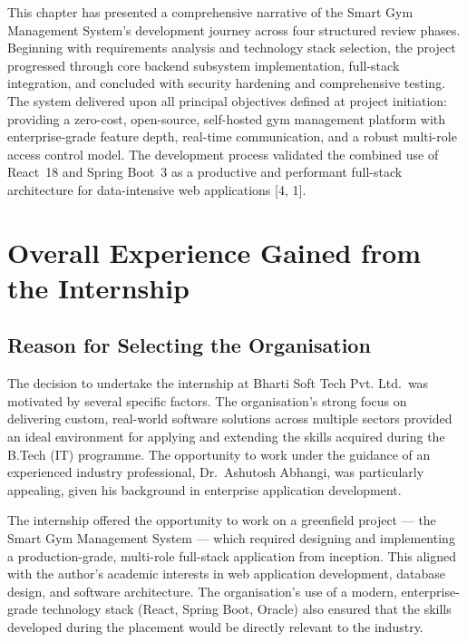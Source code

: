 \documentclass[
  12pt,
  a4paperpaper,
]{report}
\begin{document}
This chapter has presented a comprehensive narrative of the Smart
Gym Management System's development journey across four structured
review phases. Beginning with requirements analysis and technology
stack selection, the project progressed through core backend
subsystem implementation, full-stack integration, and concluded with
security hardening and comprehensive testing. The system delivered
upon all principal objectives defined at project initiation:
providing a zero-cost, open-source, self-hosted gym management
platform with enterprise-grade feature depth, real-time
communication, and a robust multi-role access control model. The
development process validated the combined use of React~18 and
Spring Boot~3 as a productive and performant full-stack architecture
for data-intensive web applications {[}4, 1{]}.

\clearpage

\chapter{Overall Experience Gained from the
Internship}\label{overall-experience-gained-from-the-internship}


\section{Reason for Selecting the
Organisation}\label{reason-for-selecting-the-organisation}

The decision to undertake the internship at Bharti Soft Tech Pvt.
Ltd.~was motivated by several specific factors. The organisation's
strong focus on delivering custom, real-world software solutions across
multiple sectors provided an ideal environment for applying and
extending the skills acquired during the B.Tech (IT) programme. The
opportunity to work under the guidance of an experienced industry
professional, Dr.~Ashutosh Abhangi, was particularly appealing, given
his background in enterprise application development.

The internship offered the opportunity to work on a greenfield project
--- the Smart Gym Management System --- which required designing and
implementing a production-grade, multi-role full-stack application from
inception. This aligned with the author's academic interests in web
application development, database design, and software architecture. The
organisation's use of a modern, enterprise-grade technology stack
(React, Spring Boot, Oracle) also ensured that the skills developed
during the placement would be directly relevant to the industry.
\end{document}
